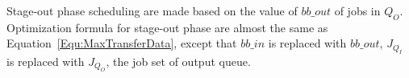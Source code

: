 Stage-out phase scheduling are made based on the value of $bb\_out$ of jobs in $Q_O$.
Optimization formula for stage-out phase are almost the same as
Equation~\ref{Equ:MaxTransferData},
except that $bb\_in$ is replaced with $bb\_out$,
$J_{Q_I}$ is replaced with $J_{Q_O}$, the job set of output queue.








